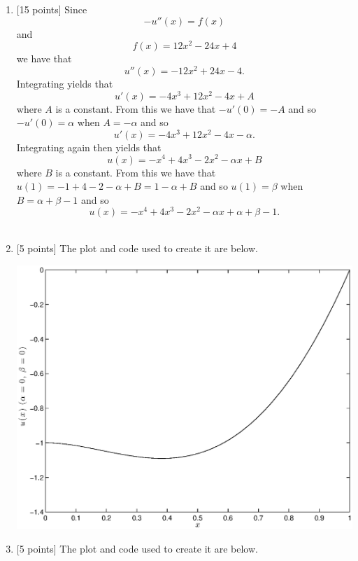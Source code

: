 \begin{solution}
\begin{enumerate}
\item {[15 points]} Since
\[
-u''(x)=f(x)
\]
and
\[
f(x)=12x^2-24x+4
\]
we have that
\[
u''(x)=-12 x^2+24x-4.
\]
Integrating yields that
\[
u'(x)=-4x^3+12x^2-4x+A
\]
where $A$ is a constant. From this we have that $-u'(0)=-A$ and so $-u'(0)=\alpha$ when $A=-\alpha$ and so
\[
u'(x)=-4x^3+12x^2-4x-\alpha.
\]
Integrating again then yields that
\[
u(x)=-x^4+4x^3-2x^2-\alpha x+B
\]
where $B$ is a constant. From this we have that $u(1)=-1+4-2-\alpha+B=1-\alpha+B$ and so $u(1)=\beta$ when $B=\alpha+\beta-1$ and so
\[
u(x)=-x^4+4x^3-2x^2-\alpha x+\alpha+\beta-1.
\]
\\
\item {[5 points]} The plot and code used to create it are below.

\begin{center}
\includegraphics[scale=0.7]{hw5b.eps}
\end{center}




\item {[5 points]} The plot and code used to create it are below.


\end{enumerate}
\end{solution}
